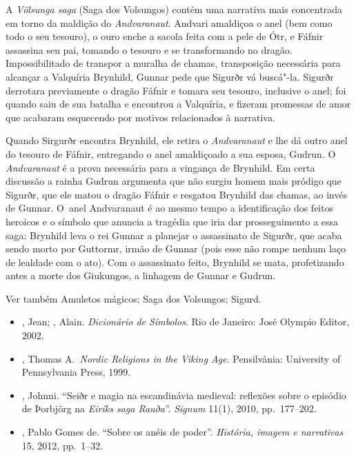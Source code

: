 A \emph{Völsunga saga} (Saga dos Volsungos) contém uma narrativa mais
concentrada em torno da maldição do \emph{Andvaranaut}. Andvari
amaldiçoa o anel (bem como todo o seu tesouro), o ouro enche a sacola
feita com a pele de Ótr, e Fáfnir assassina seu pai, tomando o tesouro e
se transformando no dragão. Impossibilitado de transpor a muralha de
chamas, transposição necessária para alcançar a Valquíria Brynhild,
Gunnar pede que Sigurðr vá buscá"-la. Sigurðr derrotara previamente o
dragão Fáfnir e tomara seu tesouro, inclusive o anel; foi quando saiu de
sua batalha e encontrou a Valquíria, e fizeram promessas de amor que
acabaram esquecendo por motivos relacionados à narrativa.

Quando Sirgurðr encontra Brynhild, ele retira o \emph{Andvaranaut} e lhe
dá outro anel do tesouro de Fáfnir, entregando o anel amaldiçoado a sua
esposa, Gudrun. O \emph{Andvaranaut} é a prova necessária para a
vingança de Brynhild. Em certa discussão a rainha Gudrun argumenta que
não surgiu homem mais pródigo que Sigurðr, que ele matou o dragão Fáfnir
e resgatou Brynhild das chamas, ao invés de Gunnar. O~anel Andvaranaut é
ao mesmo tempo a identificação dos feitos heroicos e o símbolo que
anuncia a tragédia que iria dar prosseguimento a essa saga: Brynhild
leva o rei Gunnar a planejar o assassinato de Sigurðr, que acaba sendo
morto por Guttormr, irmão de Gunnar (pois esse não rompe nenhum laço de
lealdade com o ato). Com o assassinato feito, Brynhild se mata,
profetizando antes a morte dos Giukungos, a linhagem de Gunnar e Gudrun.

Ver também Amuletos mágicos; Saga dos Volsungos; Sigurd.



\begin{itemize}\footnotesize
\item
  , Jean; , Alain. \emph{Dicionário de Símbolos}. Rio
  de Janeiro: José Olympio Editor, 2002.
\item
  , Thomas A.~\emph{Nordic Religions in the Viking Age}.
  Pensilvânia: University of Pennsylvania Press, 1999.
\item
  , Johnni. ``Seiðr e magia na escandinávia medieval: reflexões
  sobre o episódio de Þorbjörg na \emph{Eiríks saga Rauða}''.
  \emph{Signum} 11(1), 2010, pp.~177--202.
\item
  , Pablo Gomes de. ``Sobre os anéis de poder''. \emph{História,
  imagem e narrativas} 15, 2012, pp.~1--32.
\end{itemize}

